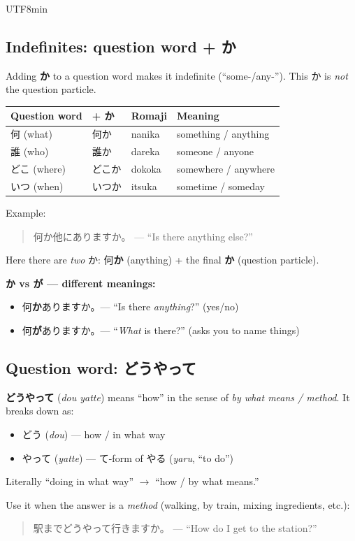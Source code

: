 \documentclass[11pt]{article}
\begin{document}
\begin{CJK}{UTF8}{min}
\subsection{Indefinites: question word + \texorpdfstring{か}{ka}}
Adding \textbf{か} to a question word makes it indefinite (``some-/any-''). This
か is \emph{not} the question particle.
\begin{center}
\begin{tabular}{@{}llll@{}}
\toprule
Question word & + か & Romaji & Meaning \\
\midrule
何 (what)   & 何か   & nanika & something / anything \\
誰 (who)    & 誰か   & dareka & someone / anyone \\
どこ (where)& どこか & dokoka & somewhere / anywhere \\
いつ (when) & いつか & itsuka & sometime / someday \\
\bottomrule
\end{tabular}
\end{center}
Example:
\begin{quote}
何か他にありますか。 --- ``Is there anything else?''
\end{quote}
Here there are \emph{two} か: 何\textbf{か} (anything) + the final \textbf{か}
(question particle).

\textbf{か vs が --- different meanings:}
\begin{itemize}
  \item 何\textbf{か}ありますか。--- ``Is there \emph{anything}?'' (yes/no)
  \item 何\textbf{が}ありますか。--- ``\emph{What} is there?'' (asks you to name things)
\end{itemize}

\subsection{Question word: \texorpdfstring{どうやって}{dou yatte}}
\textbf{どうやって} (\emph{dou yatte}) means ``how'' in the sense of
\emph{by what means / method}. It breaks down as:
\begin{itemize}
  \item どう (\emph{dou}) --- how / in what way
  \item やって (\emph{yatte}) --- て-form of やる (\emph{yaru}, ``to do'')
\end{itemize}
Literally ``doing in what way'' $\rightarrow$ ``how / by what means.''

Use it when the answer is a \emph{method} (walking, by train, mixing
ingredients, etc.):
\begin{quote}
駅までどうやって行きますか。 --- ``How do I get to the station?''
\end{quote}


\end{CJK}
\end{document}
